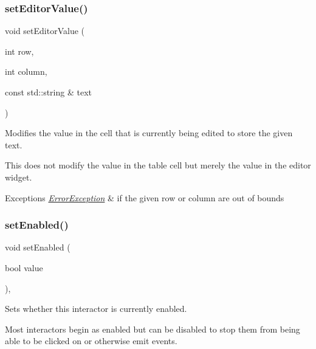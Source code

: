 \subsubsection{\texorpdfstring{set\+Editor\+Value()}{setEditorValue()}}
{\footnotesize\ttfamily void set\+Editor\+Value (\begin{DoxyParamCaption}\item[{int}]{row,  }\item[{int}]{column,  }\item[{const std\+::string \&}]{text }\end{DoxyParamCaption})\hspace{0.3cm}{\ttfamily [virtual]}}



Modifies the value in the cell that is currently being edited to store the given text. 

This does not modify the value in the table cell but merely the value in the editor widget. 
\begin{DoxyExceptions}{Exceptions}
{\em \mbox{\hyperlink{classErrorException}{Error\+Exception}}} & if the given row or column are out of bounds \\
\hline
\end{DoxyExceptions}
\mbox{\label{classGInteractor_ab831367dd84bbd579e02e55bacb21343}} 
\subsubsection{\texorpdfstring{set\+Enabled()}{setEnabled()}}
{\footnotesize\ttfamily void set\+Enabled (\begin{DoxyParamCaption}\item[{bool}]{value }\end{DoxyParamCaption})\hspace{0.3cm}{\ttfamily [virtual]}, {\ttfamily [inherited]}}



Sets whether this interactor is currently enabled. 

Most interactors begin as enabled but can be disabled to stop them from being able to be clicked on or otherwise emit events. \mbox{\label{classGObservable_ad2f6d34961c50f6c1e0659990b79f741}} 

